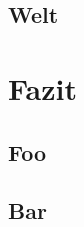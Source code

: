 \documentclass[10pt]{scrartcl}
\begin{document}
    \blindtext

    \subsection{Welt}

    \blindtext


    \section{Fazit}

    \subsection{Foo}

    \blindtext

    \subsection{Bar}

    \blindtext
\end{document}
